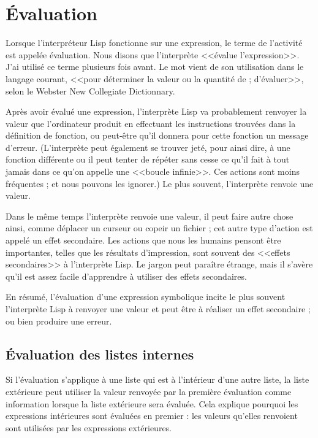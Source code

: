 \section{\'Evaluation}

Lorsque l'interpréteur Lisp fonctionne sur une expression, le terme de
l'activité est appelée évaluation. Nous disons que l'interprète
<<évalue l'expression>>. J'ai utilisé ce terme plusieurs fois
avant. Le mot vient de son utilisation dans le langage courant, <<pour
déterminer la valeur ou la quantité de ; d'évaluer>>, selon le Webster New
Collegiate Dictionnary.

Après avoir évalué une expression, l'interprète Lisp va probablement
renvoyer la valeur que l'ordinateur produit en effectuant les
instructions trouvées dans la définition de fonction, ou peut-être
qu'il donnera pour cette fonction un message d'erreur. (L'interprète
peut également se trouver jeté, pour ainsi dire, à une fonction
différente ou il peut tenter de répéter sans cesse ce qu'il fait à
tout jamais dans ce qu'on appelle une <<boucle infinie>>. Ces actions
sont moins fréquentes ; et nous pouvons les ignorer.) Le plus souvent,
l'interprète renvoie une valeur. 

Dans le même temps l'interprète renvoie une valeur, il peut faire
autre chose ainsi, comme déplacer un curseur ou copeir un fichier ;
cet autre type d'action est appelé un effet secondaire. Les actions que
nous les humains pensont être importantes, telles que les résultats
d'impression, sont souvent des <<effets secondaires>> à l'interprète
Lisp. Le jargon peut paraître étrange, mais il s'avère qu'il est assez
facile d'apprendre à utiliser des effets secondaires.

En résumé, l'évaluation d'une expression symbolique incite le plus souvent
l'interprète Lisp à renvoyer une valeur et peut être à réaliser un
effet secondaire ; ou bien produire une erreur.

\subsection{\'Evaluation des listes internes}

Si l'évaluation s'applique à une liste qui est à l'intérieur d'une
autre liste, la liste extérieure peut utiliser la valeur renvoyée par
la première évaluation comme information lorsque la liste extérieure
sera évaluée. Cela explique pourquoi les expressions intérieures sont
évaluées en premier : les valeurs qu'elles renvoient sont utilisées
par les expressions extérieures.

